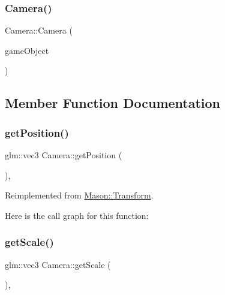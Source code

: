 \subsubsection{\texorpdfstring{Camera()}{Camera()}}
{\footnotesize\ttfamily Camera\+::\+Camera (\begin{DoxyParamCaption}\item[{\hyperlink{class_mason_1_1_game_object}{Game\+Object} $\ast$}]{game\+Object }\end{DoxyParamCaption})\hspace{0.3cm}{\ttfamily [protected]}}



\subsection{Member Function Documentation}
\hypertarget{class_mason_1_1_camera_a71560b8b6216a542ae1958bd91a4361d}{}\label{class_mason_1_1_camera_a71560b8b6216a542ae1958bd91a4361d} 
\subsubsection{\texorpdfstring{get\+Position()}{getPosition()}}
{\footnotesize\ttfamily glm\+::vec3 Camera\+::get\+Position (\begin{DoxyParamCaption}{ }\end{DoxyParamCaption})\hspace{0.3cm}{\ttfamily [override]}, {\ttfamily [virtual]}}



Reimplemented from \hyperlink{class_mason_1_1_transform_a0b21f641e72d7b55f3a630b986d0b106}{Mason\+::\+Transform}.

Here is the call graph for this function\+:
\hypertarget{class_mason_1_1_camera_a405b26eaaae2ab7a460dfc319a9d16ea}{}\label{class_mason_1_1_camera_a405b26eaaae2ab7a460dfc319a9d16ea} 
\subsubsection{\texorpdfstring{get\+Scale()}{getScale()}}
{\footnotesize\ttfamily glm\+::vec3 Camera\+::get\+Scale (\begin{DoxyParamCaption}{ }\end{DoxyParamCaption})\hspace{0.3cm}{\ttfamily [override]}, {\ttfamily [virtual]}}



